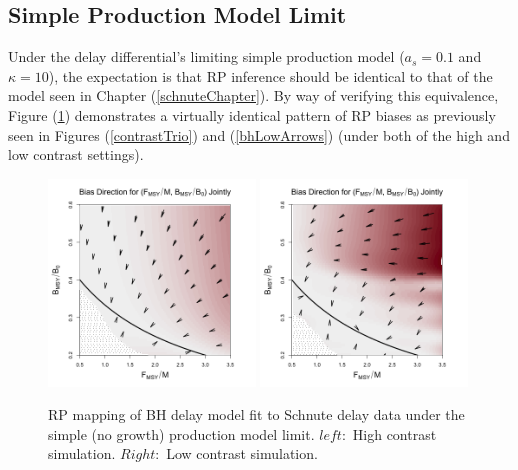 %
\clearpage
%
\subsection{Simple Production Model Limit}

%
Under the delay differential's limiting simple production model ($a_s=0.1$ and $\kappa=10$), 
the expectation is that RP inference should be identical to that of the model seen in 
Chapter (\ref{schnuteChapter}). By way of verifying this equivalence, Figure (\ref{prodLimit}) 
demonstrates a virtually identical pattern of RP biases as previously seen in 
Figures (\ref{contrastTrio}) and (\ref{bhLowArrows}) (under both of the high and 
low contrast settings).

%
\begin{figure}[h!]
\includegraphics[width=0.49\textwidth]{../ddBias/directionalBiasDDSubExpT45N300AS0.1K10.png}
\includegraphics[width=0.49\textwidth]{../ddBias/directionalBiasDDSubFlatT45N150A0-1AS0.1K10N56.png} 
\caption{
RP mapping of BH delay model fit to Schnute delay data under the simple (no 
growth) production model limit. $left:$ High contrast simulation. 
$Right:$ Low contrast simulation.
}\label{prodLimit}
\end{figure}


